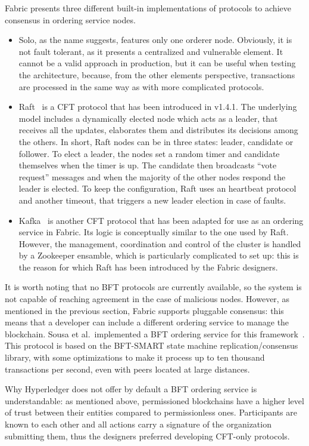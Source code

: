 Fabric presents three different built-in implementations of protocols to achieve consensus in ordering service nodes.
\begin{itemize}
    \item Solo, as the name suggests, features only one orderer node. Obviously, it is not fault tolerant, as it presents a centralized and vulnerable element. It cannot be a valid approach in production, but it can be useful when testing the architecture, because, from the other elements perspective, transactions are processed in the same way as with more complicated protocols. 
    \item Raft~\cite{raft} is a CFT protocol that has been introduced in v1.4.1. The underlying model includes a dynamically elected node which acts as a leader, that receives all the updates, elaborates them and distributes its decisions among the others. In short, Raft nodes can be in three states: leader, candidate or follower. To elect a leader, the nodes set a random timer and candidate themselves when the timer is up. The candidate then broadcasts ``vote request'' messages and when the majority of the other nodes respond the leader is elected. To keep the configuration, Raft uses an heartbeat protocol and another timeout, that triggers a new leader election in case of faults.
    \item Kafka~\cite{kafka} is another CFT protocol that has been adapted for use as an ordering service in Fabric. Its logic is conceptually similar to the one used by Raft. However, the management, coordination and control of the cluster is handled by a Zookeeper ensamble, which is particularly complicated to set up: this is the reason for which Raft has been introduced by the Fabric designers.
\end{itemize}

It is worth noting that no BFT protocols are currently available, so the system is not capable of reaching agreement in the case of malicious nodes. However, as mentioned in the previous section, Fabric supports pluggable consensus: this means that a developer can include a different ordering service to manage the blockchain. Sousa et al.\ implemented a BFT ordering service for this framework~\cite{bft_fabric}. This protocol is based on the BFT-SMART state machine replication/consensus library, with some optimizations to make it process up to ten thousand transactions per second, even with peers located at large distances. 

Why Hyperledger does not offer by default a BFT ordering service is understandable: as mentioned above, permissioned blockchains have a higher level of trust between their  entities compared to permissionless ones. Participants are known to each other and all actions carry a signature of the organization submitting them, thus the designers preferred developing CFT-only protocols. 

